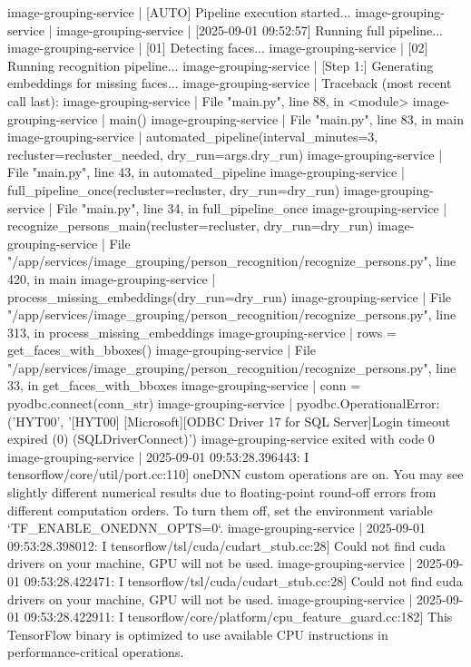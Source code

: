 image-grouping-service  | [AUTO] Pipeline execution started...
image-grouping-service  |
image-grouping-service  | [2025-09-01 09:52:57] Running full pipeline...
image-grouping-service  | [01] Detecting faces...
image-grouping-service  | [02] Running recognition pipeline...
image-grouping-service  | [Step 1:] Generating embeddings for missing faces...
image-grouping-service  | Traceback (most recent call last):
image-grouping-service  |   File "main.py", line 88, in <module>
image-grouping-service  |     main()
image-grouping-service  |   File "main.py", line 83, in main
image-grouping-service  |     automated_pipeline(interval_minutes=3, recluster=recluster_needed, dry_run=args.dry_run)
image-grouping-service  |   File "main.py", line 43, in automated_pipeline
image-grouping-service  |     full_pipeline_once(recluster=recluster, dry_run=dry_run)
image-grouping-service  |   File "main.py", line 34, in full_pipeline_once
image-grouping-service  |     recognize_persons_main(recluster=recluster, dry_run=dry_run)
image-grouping-service  |   File "/app/services/image_grouping/person_recognition/recognize_persons.py", line 420, in main
image-grouping-service  |     process_missing_embeddings(dry_run=dry_run)
image-grouping-service  |   File "/app/services/image_grouping/person_recognition/recognize_persons.py", line 313, in process_missing_embeddings
image-grouping-service  |     rows = get_faces_with_bboxes()
image-grouping-service  |   File "/app/services/image_grouping/person_recognition/recognize_persons.py", line 33, in get_faces_with_bboxes
image-grouping-service  |     conn = pyodbc.connect(conn_str)
image-grouping-service  | pyodbc.OperationalError: ('HYT00', '[HYT00] [Microsoft][ODBC Driver 17 for SQL Server]Login timeout expired (0) (SQLDriverConnect)')
image-grouping-service exited with code 0
image-grouping-service  | 2025-09-01 09:53:28.396443: I tensorflow/core/util/port.cc:110] oneDNN custom operations are on. You may see slightly different numerical results due to floating-point round-off errors from different computation orders. To turn them off, set the environment variable `TF_ENABLE_ONEDNN_OPTS=0`.
image-grouping-service  | 2025-09-01 09:53:28.398012: I tensorflow/tsl/cuda/cudart_stub.cc:28] Could not find cuda drivers on your machine, GPU will not be used.
image-grouping-service  | 2025-09-01 09:53:28.422471: I tensorflow/tsl/cuda/cudart_stub.cc:28] Could not find cuda drivers on your machine, GPU will not be used.
image-grouping-service  | 2025-09-01 09:53:28.422911: I tensorflow/core/platform/cpu_feature_guard.cc:182] This TensorFlow binary is optimized to use available CPU instructions in performance-critical operations.
